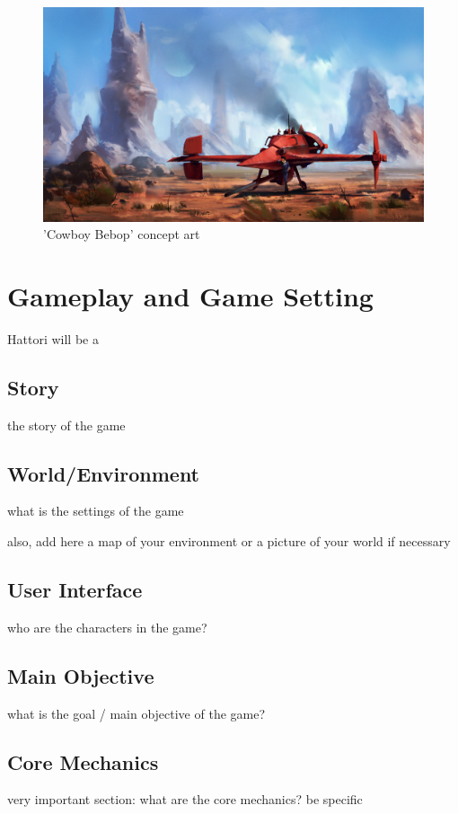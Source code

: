 \documentclass[a4paper]{scrreprt}
\begin{document}
\begin{figure}
  \centering
  \includegraphics[width=1\textwidth]{Spaceship}
  \caption{'Cowboy Bebop' concept art}
  \end{figure}

\chapter{Gameplay and Game Setting}
Hattori will be a 
\section{Story}
the story of the game

\section{World/Environment}
what is the settings of the game 

also, add here a map of your environment or a picture of your world if necessary

\section{User Interface}
who are the characters in the game?

\section{Main Objective}
what is the goal / main objective of the game?

\section{Core Mechanics}
very important section: what are the core mechanics? be specific
\end{document}
